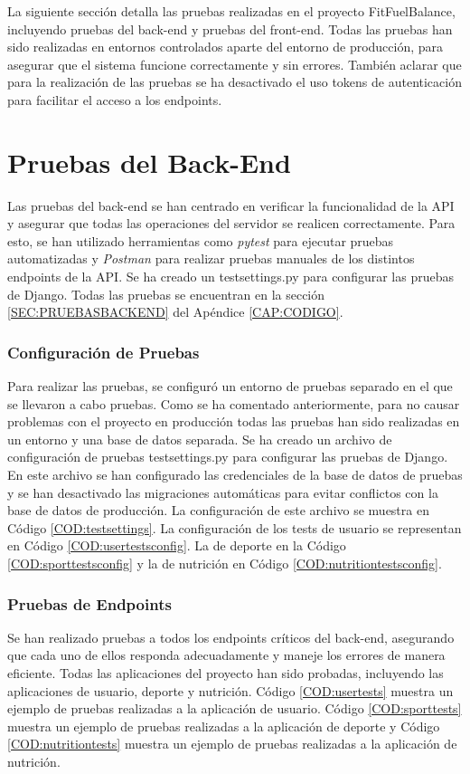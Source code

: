 La siguiente sección detalla las pruebas realizadas en el proyecto FitFuelBalance, incluyendo pruebas del back-end y pruebas del front-end. Todas las pruebas han sido realizadas en entornos controlados aparte del entorno de producción, para asegurar que el sistema funcione correctamente y sin errores. También aclarar que para la realización de las pruebas se ha desactivado el uso tokens de autenticación para facilitar el acceso a los endpoints.
\section{Pruebas del Back-End}

Las pruebas del back-end se han centrado en verificar la funcionalidad de la API y asegurar que todas las operaciones del servidor se realicen correctamente. Para esto, se han utilizado herramientas como \textit{pytest} para ejecutar pruebas automatizadas y \textit{Postman} para realizar pruebas manuales de los distintos endpoints de la API. Se ha creado un testsettings.py para configurar las pruebas de Django. Todas las pruebas se encuentran en la sección \ref{SEC:PRUEBASBACKEND} del Apéndice \ref{CAP:CODIGO}.

\subsubsection{Configuración de Pruebas}
Para realizar las pruebas, se configuró un entorno de pruebas separado en el que se llevaron a cabo pruebas. Como se ha comentado anteriormente, para no causar problemas con el proyecto en producción todas las pruebas han sido realizadas en un entorno y una base de datos separada. Se ha creado un archivo de configuración de pruebas testsettings.py para configurar las pruebas de Django. En este archivo se han configurado las credenciales de la base de datos de pruebas y se han desactivado las migraciones automáticas para evitar conflictos con la base de datos de producción. La configuración de este archivo se muestra en Código \ref{COD:testsettings}.
La configuración de los tests de usuario se representan en Código \ref{COD:usertestsconfig}. La de deporte en la Código \ref{COD:sporttestsconfig} y la de nutrición en Código \ref{COD:nutritiontestsconfig}.

\subsubsection{Pruebas de Endpoints}
Se han realizado pruebas a todos los endpoints críticos del back-end, asegurando que cada uno de ellos responda adecuadamente y maneje los errores de manera eficiente. Todas las aplicaciones del proyecto han sido probadas, incluyendo las aplicaciones de usuario, deporte y nutrición. Código \ref{COD:usertests} muestra un ejemplo de pruebas realizadas a la aplicación de usuario. Código \ref{COD:sporttests} muestra un ejemplo de pruebas realizadas a la aplicación de deporte y Código \ref{COD:nutritiontests} muestra un ejemplo de pruebas realizadas a la aplicación de nutrición.
